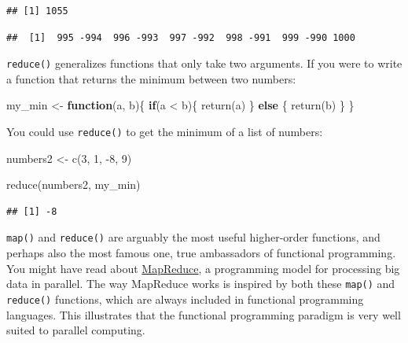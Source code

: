 \documentclass[
]{article}
\newenvironment{Shaded}{\begin{snugshade}}{\end{snugshade}}
\newcommand{\ControlFlowTok}[1]{\textcolor[rgb]{0.13,0.29,0.53}{\textbf{#1}}}
\newcommand{\DecValTok}[1]{\textcolor[rgb]{0.00,0.00,0.81}{#1}}
\newcommand{\FunctionTok}[1]{\textcolor[rgb]{0.00,0.00,0.00}{#1}}
\newcommand{\NormalTok}[1]{#1}
\newcommand{\OtherTok}[1]{\textcolor[rgb]{0.56,0.35,0.01}{#1}}
\newcommand{\SpecialCharTok}[1]{\textcolor[rgb]{0.00,0.00,0.00}{#1}}
\begin{document}
\begin{verbatim}
## [1] 1055
\end{verbatim}

\begin{verbatim}
##  [1]  995 -994  996 -993  997 -992  998 -991  999 -990 1000
\end{verbatim}

\texttt{reduce()} generalizes functions that only take two arguments. If you were to write a function that returns
the minimum between two numbers:

\begin{Shaded}
\begin{Highlighting}[]
\NormalTok{my\_min }\OtherTok{\textless{}{-}} \ControlFlowTok{function}\NormalTok{(a, b)\{}
    \ControlFlowTok{if}\NormalTok{(a }\SpecialCharTok{\textless{}}\NormalTok{ b)\{}
        \FunctionTok{return}\NormalTok{(a)}
\NormalTok{    \} }\ControlFlowTok{else}\NormalTok{ \{}
        \FunctionTok{return}\NormalTok{(b)}
\NormalTok{    \}}
\NormalTok{\}}
\end{Highlighting}
\end{Shaded}

You could use \texttt{reduce()} to get the minimum of a list of numbers:

\begin{Shaded}
\begin{Highlighting}[]
\NormalTok{numbers2 }\OtherTok{\textless{}{-}} \FunctionTok{c}\NormalTok{(}\DecValTok{3}\NormalTok{, }\DecValTok{1}\NormalTok{, }\SpecialCharTok{{-}}\DecValTok{8}\NormalTok{, }\DecValTok{9}\NormalTok{)}

\FunctionTok{reduce}\NormalTok{(numbers2, my\_min)}
\end{Highlighting}
\end{Shaded}

\begin{verbatim}
## [1] -8
\end{verbatim}

\texttt{map()} and \texttt{reduce()} are arguably the most useful higher-order functions, and perhaps also the
most famous one, true ambassadors of functional programming. You might have read about
\href{https://en.wikipedia.org/wiki/MapReduce}{MapReduce}, a programming model for processing big
data in parallel. The way MapReduce works is inspired by both these \texttt{map()} and \texttt{reduce()} functions,
which are always included in functional programming languages. This illustrates that the functional
programming paradigm is very well suited to parallel computing.
\end{document}
